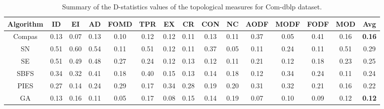 \begin{table}
\centering
\caption{Summary of the D-statistics values of the topological measures for Com-dblp dataset.}
\label{tab_dblp}
\begin{adjustbox}{max width=\textwidth}
\begin{tabular}{c|c c c c c c c c c c c c c | c}
\hline
Algorithm & ID & EI & AD & FOMD & TPR & EX & CR & CON & NC & AODF & MODF & FODF & MOD & Avg\\ \hline
Compas    & 0.13   & 0.07   & 0.13   & 0.10     & 0.12    & 0.12   & 0.11   & 0.13    & 0.11   & 0.37     & 0.05     & 0.41     & 0.16 & {\bf 0.16}  \\ 
SN        &  0.51  & 0.60   & 0.54   & 0.11    & 0.51    & 0.12   & 0.11   & 0.37    & 0.05   & 0.11     &   0.24   & 0.11     & 0.51  & 0.29  \\ 
SE        &  0.51  & 0.49   & 0.48   & 0.27    & 0.24    & 0.12   & 0.13   & 0.12    & 0.11   & 0.21     & 0.12     &  0.18    & 0.23  & 0.25  \\ 
SBFS      &  0.34  & 0.32   & 0.41   & 0.18     & 0.40    & 0.15   & 0.13   &  0.14   & 0.18   &  0.12    &   0.34   & 0.24     & 0.11 & 0.24   \\ 
PIES      & 0.27   &  0.14  & 0.24   &  0.29    & 0.17    & 0.34   & 0.28   &  0.19   &  0.20  & 0.31     & 0.32     &  0.21    &  0.16 & 0.22  \\ 
GA        & 0.13   & 0.16   & 0.11   &  0.05    &  0.17  & 0.08   &  0.15  &  0.14   & 0.19   & 0.07     &  0.10    &  0.09    & 0.12   & {\bf 0.12} \\ \hline
\end{tabular}
\end{adjustbox}
\vspace{3mm}
\end{table}



